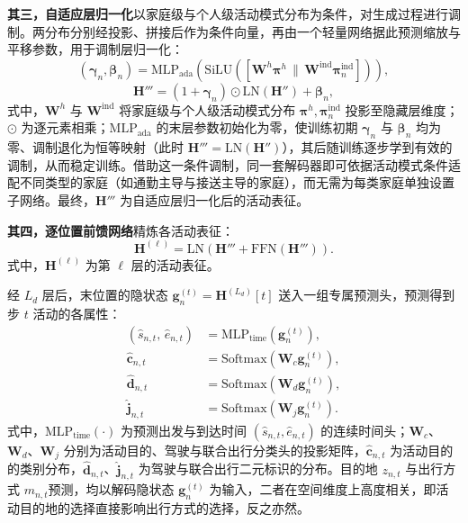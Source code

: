 \textbf{其三，自适应层归一化}以家庭级与个人级活动模式分布为条件，对生成过程进行调制。两分布分别经投影、拼接后作为条件向量，再由一个轻量网络据此预测缩放与平移参数，用于调制层归一化：
\begin{equation}
(\boldsymbol{\gamma}_n,\boldsymbol{\beta}_n)=\mathrm{MLP}_{\text{ada}}\!\left(\mathrm{SiLU}\!\left(\left[\mathbf{W}^{h}\boldsymbol{\pi}^{h}\,\|\,\mathbf{W}^{\text{ind}}\boldsymbol{\pi}_n^{\text{ind}}\right]\right)\right),
\label{eq.cohact.adaln1}
\end{equation}
\begin{equation}
\mathbf{H}'''=(1+\boldsymbol{\gamma}_n)\odot\mathrm{LN}(\mathbf{H}'')+\boldsymbol{\beta}_n,
\label{eq.cohact.adaln2}
\end{equation}
式中，$\mathbf{W}^{h}$ 与 $\mathbf{W}^{\text{ind}}$ 将家庭级与个人级活动模式分布 $\boldsymbol{\pi}^{h},\boldsymbol{\pi}_n^{\text{ind}}$ 投影至隐藏层维度；$\odot$ 为逐元素相乘；$\mathrm{MLP}_{\text{ada}}$ 的末层参数初始化为零，使训练初期 $\boldsymbol{\gamma}_n$ 与 $\boldsymbol{\beta}_n$ 均为零、调制退化为恒等映射（此时 $\mathbf{H}'''=\mathrm{LN}(\mathbf{H}'')$），其后随训练逐步学到有效的调制，从而稳定训练。借助这一条件调制，同一套解码器即可依据活动模式条件适配不同类型的家庭（如通勤主导与接送主导的家庭），而无需为每类家庭单独设置子网络。最终，$\mathbf{H}'''$ 为自适应层归一化后的活动表征。

\textbf{其四，逐位置前馈网络}精炼各活动表征：
\begin{equation}
\mathbf{H}^{(\ell)}=\mathrm{LN}\!\left(\mathbf{H}'''+\mathrm{FFN}(\mathbf{H}''')\right).
\label{eq.cohact.decffn}
\end{equation}
式中，$\mathbf{H}^{(\ell)}$ 为第 $\ell$ 层的活动表征。

经 $L_d$ 层后，末位置的隐状态 $\mathbf{g}_n^{(t)}=\mathbf{H}^{(L_d)}[t]$ 送入一组专属预测头，预测得到步 $t$ 活动的各属性：
\begin{equation}
\begin{aligned}
(\hat{s}_{n,t},\,\hat{e}_{n,t}) &= \mathrm{MLP}_{\text{time}}\!\left(\mathbf{g}_n^{(t)}\right), \\
\hat{\mathbf{c}}_{n,t} &= \mathrm{Softmax}\!\left(\mathbf{W}_c\mathbf{g}_n^{(t)}\right), \\
\hat{\mathbf{d}}_{n,t} &= \mathrm{Softmax}\!\left(\mathbf{W}_d\mathbf{g}_n^{(t)}\right), \\
\hat{\mathbf{j}}_{n,t} &= \mathrm{Softmax}\!\left(\mathbf{W}_j\mathbf{g}_n^{(t)}\right).
\end{aligned}
\label{eq.cohact.heads}
\end{equation}
式中，$\mathrm{MLP}_{\text{time}}(\cdot)$ 为预测出发与到达时间 $(\hat{s}_{n,t},\hat{e}_{n,t})$ 的连续时间头；$\mathbf{W}_c$、$\mathbf{W}_d$、$\mathbf{W}_j$ 分别为活动目的、驾驶与联合出行分类头的投影矩阵，$\hat{\mathbf{c}}_{n,t}$ 为活动目的的类别分布，$\hat{\mathbf{d}}_{n,t}$、$\hat{\mathbf{j}}_{n,t}$ 为驾驶与联合出行二元标识的分布。目的地 $z_{n,t}$ 与出行方式 $m_{n,t}$预测，均以解码隐状态 $\mathbf{g}_n^{(t)}$ 为输入，二者在空间维度上高度相关，即活动目的地的选择直接影响出行方式的选择，反之亦然。

